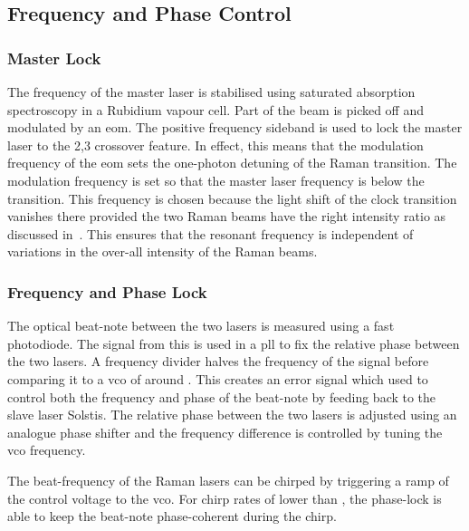 \subsection{Frequency and Phase Control}\label{subsec:msquared_control}

\subsubsection{Master Lock}
The frequency of the master laser is stabilised using saturated absorption
spectroscopy in a Rubidium vapour cell. Part of the beam is picked off and
modulated by an \ac{eom}. The positive frequency sideband is used to lock the
master laser to the 2,3 crossover feature. In effect, this means that the
modulation frequency of the \ac{eom} sets the one-photon detuning of the Raman
transition. The modulation frequency is set so that the master laser frequency
is  below the  transition. This
frequency is chosen because the light shift of the clock transition
vanishes there provided the two Raman beams have the right intensity
ratio as discussed in~. This ensures
that the resonant frequency is independent of variations in the
over-all intensity of the Raman beams.
\subsubsection{Frequency and Phase Lock} The optical beat-note between the two
lasers is measured using a fast photodiode. The signal from this is used in a
\ac{pll} to fix the relative phase between the two lasers. A frequency
divider halves the frequency of the signal before comparing it to a \ac{vco} of
around . This creates an error signal which used to
control both the frequency and phase of the beat-note by feeding back to the
slave laser Solstis. The relative phase between the two lasers is adjusted using
an analogue phase shifter and the frequency difference is controlled by tuning
the \ac{vco} frequency. \par\noindent The beat-frequency of the Raman lasers can
be chirped by triggering a ramp of the control voltage to the \ac{vco}. For
chirp rates of lower than , the phase-lock
is able to keep the beat-note phase-coherent during the chirp.  
